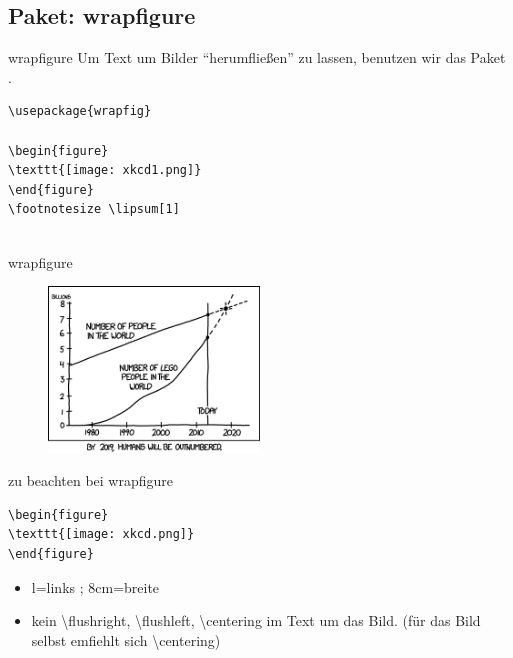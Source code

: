 \subsection{Paket: wrapfigure}

\begin{frame}[fragile]{wrapfigure}
Um Text um Bilder \enquote{herumfließen} zu lassen, benutzen wir das Paket .

\begin{codeblock}
\begin{verbatim}
\usepackage{wrapfig}

\begin{figure}
\texttt{[image: xkcd1.png]}
\end{figure}
\footnotesize \lipsum[1]


\end{verbatim}
\end{codeblock}
\pause
\end{frame}

\begin{frame}[fragile]{wrapfigure}
\begin{figure}
\includegraphics[width=0.5\textwidth]{images/xkcd1.png}
\end{figure}
\footnotesize \lipsum[1]
\end{frame}

\begin{frame}[fragile]{zu beachten bei wrapfigure}
\begin{codeblock}
\begin{verbatim}
\begin{figure}
\texttt{[image: xkcd.png]}
\end{figure}
\end{verbatim}
\end{codeblock}

\begin{itemize}
 \item l=links ; 8cm=breite
 \item kein \textbackslash flushright, \textbackslash flushleft, \textbackslash centering im Text um das Bild. 
 (für das Bild selbst emfiehlt sich \textbackslash centering)
\end{itemize}
\end{frame}

